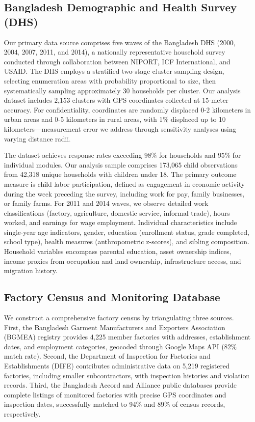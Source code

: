 \documentclass[12pt]{article}
\begin{document}
\subsection{Bangladesh Demographic and Health Survey (DHS)}

Our primary data source comprises five waves of the Bangladesh DHS (2000, 2004, 2007, 2011, and 2014), a nationally representative household survey conducted through collaboration between NIPORT, ICF International, and USAID. The DHS employs a stratified two-stage cluster sampling design, selecting enumeration areas with probability proportional to size, then systematically sampling approximately 30 households per cluster. Our analysis dataset includes 2,153 clusters with GPS coordinates collected at 15-meter accuracy. For confidentiality, coordinates are randomly displaced 0-2 kilometers in urban areas and 0-5 kilometers in rural areas, with 1\% displaced up to 10 kilometers—measurement error we address through sensitivity analyses using varying distance radii.

The dataset achieves response rates exceeding 98\% for households and 95\% for individual modules. Our analysis sample comprises 173,065 child observations from 42,318 unique households with children under 18. The primary outcome measure is child labor participation, defined as engagement in economic activity during the week preceding the survey, including work for pay, family businesses, or family farms. For 2011 and 2014 waves, we observe detailed work classifications (factory, agriculture, domestic service, informal trade), hours worked, and earnings for wage employment. Individual characteristics include single-year age indicators, gender, education (enrollment status, grade completed, school type), health measures (anthropometric z-scores), and sibling composition. Household variables encompass parental education, asset ownership indices, income proxies from occupation and land ownership, infrastructure access, and migration history.

\subsection{Factory Census and Monitoring Database}

We construct a comprehensive factory census by triangulating three sources. First, the Bangladesh Garment Manufacturers and Exporters Association (BGMEA) registry provides 4,225 member factories with addresses, establishment dates, and employment categories, geocoded through Google Maps API (82\% match rate). Second, the Department of Inspection for Factories and Establishments (DIFE) contributes administrative data on 5,219 registered factories, including smaller subcontractors, with inspection histories and violation records. Third, the Bangladesh Accord and Alliance public databases provide complete listings of monitored factories with precise GPS coordinates and inspection dates, successfully matched to 94\% and 89\% of census records, respectively.
\end{document}
